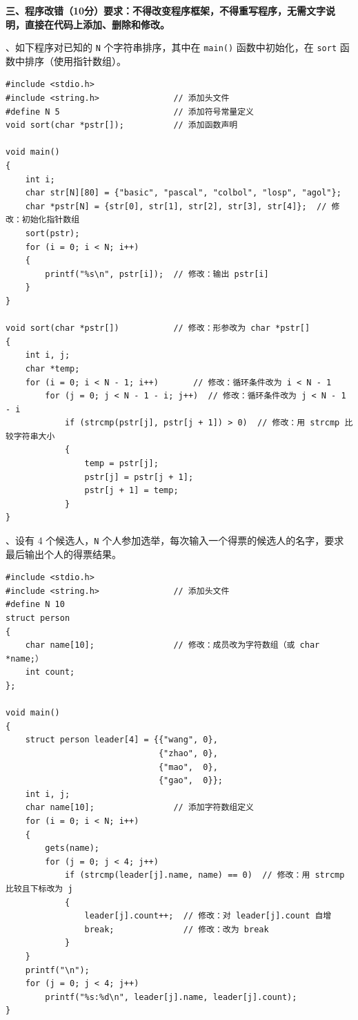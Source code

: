 \documentclass[UTF8,a4paper,10.5pt]{ctexart}
\begin{document}
\newpage
\noindent\textbf{三、程序改错（10分）要求：不得改变程序框架，不得重写程序，无需文字说明，直接在代码上添加、删除和修改。}

、如下程序对已知的 \texttt{N} 个字符串排序，其中在 \texttt{main()} 函数中初始化，在 \texttt{sort} 函数中排序（使用指针数组）。
\begin{lstlisting}
#include <stdio.h>
#include <string.h>               // 添加头文件
#define N 5                       // 添加符号常量定义
void sort(char *pstr[]);          // 添加函数声明

void main()
{
    int i;
    char str[N][80] = {"basic", "pascal", "colbol", "losp", "agol"};
    char *pstr[N] = {str[0], str[1], str[2], str[3], str[4]};  // 修改：初始化指针数组
    sort(pstr);
    for (i = 0; i < N; i++)
    {
        printf("%s\n", pstr[i]);  // 修改：输出 pstr[i]
    }
}

void sort(char *pstr[])           // 修改：形参改为 char *pstr[]
{
    int i, j;
    char *temp;
    for (i = 0; i < N - 1; i++)       // 修改：循环条件改为 i < N - 1
        for (j = 0; j < N - 1 - i; j++)  // 修改：循环条件改为 j < N - 1 - i
            if (strcmp(pstr[j], pstr[j + 1]) > 0)  // 修改：用 strcmp 比较字符串大小
            {
                temp = pstr[j];
                pstr[j] = pstr[j + 1];
                pstr[j + 1] = temp;
            }
}
\end{lstlisting}

\medskip
{}、设有 4 个候选人，\texttt{N} 个人参加选举，每次输入一个得票的候选人的名字，要求最后输出个人的得票结果。
\begin{lstlisting}
#include <stdio.h>
#include <string.h>               // 添加头文件
#define N 10
struct person
{
    char name[10];                // 修改：成员改为字符数组（或 char *name;）
    int count;
};

void main()
{
    struct person leader[4] = {{"wang", 0},
                               {"zhao", 0},
                               {"mao",  0},
                               {"gao",  0}};
    int i, j;
    char name[10];                // 添加字符数组定义
    for (i = 0; i < N; i++)
    {
        gets(name);
        for (j = 0; j < 4; j++)
            if (strcmp(leader[j].name, name) == 0)  // 修改：用 strcmp 比较且下标改为 j
            {
                leader[j].count++;  // 修改：对 leader[j].count 自增
                break;              // 修改：改为 break
            }
    }
    printf("\n");
    for (j = 0; j < 4; j++)
        printf("%s:%d\n", leader[j].name, leader[j].count);
}
\end{lstlisting}
\end{document}
